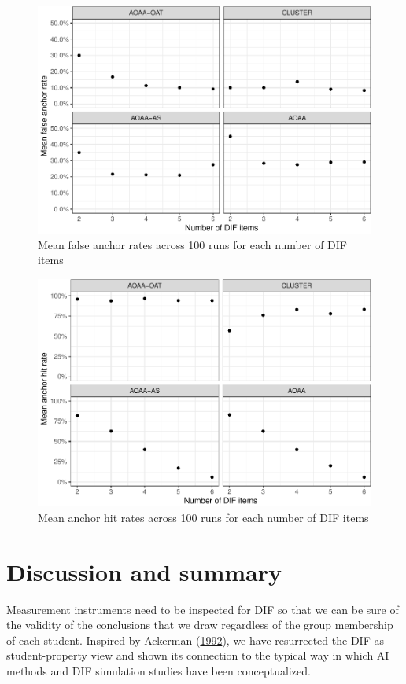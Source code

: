\documentclass[
  11pt,
]{article}
\begin{document}
\begin{figure}[H]

{\centering \includegraphics[width=0.7\linewidth]{paper_files/figure-latex/anchorfalse-1} 

}

\caption{Mean false anchor rates across 100 runs for each number of DIF items}\label{fig:anchorfalse}
\end{figure}

\begin{figure}[H]

{\centering \includegraphics[width=0.7\linewidth]{paper_files/figure-latex/anchorhit-1} 

}

\caption{Mean anchor hit rates across 100 runs for each number of DIF items}\label{fig:anchorhit}
\end{figure}

\hypertarget{discussion-and-summary}{%
\section{Discussion and summary}\label{discussion-and-summary}}

Measurement instruments need to be inspected for DIF so that we can be sure of the validity of the conclusions that we draw regardless of the group membership of each student. Inspired by Ackerman (\protect\hyperlink{ref-ackerman1992didactic}{1992}), we have resurrected the DIF-as-student-property view and shown its connection to the typical way in which AI methods and DIF simulation studies have been conceptualized.
\end{document}
